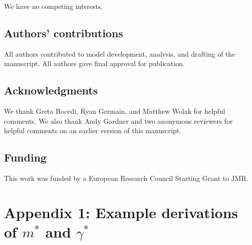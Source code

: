\documentclass[12pt]{article}
\begin{document}
We have no competing interests.

\subsection*{Authors' contributions}

All authors contributed to model development, analysis, and drafting of the manuscript. All authors gave final approval for publication. 

\subsection*{Acknowledgments}

We thank Greta Bocedi, Ryan Germain, and Matthew Wolak for helpful comments. We also thank Andy Gardner and two anonymous reviewers for helpful comments on an earlier version of this manuscript.

\subsection*{Funding}

This work was funded by a European Research Council Starting Grant to JMR.

\section*{Appendix 1: Example derivations of $m^{*}$ and $\gamma^{*}$}
\end{document}
